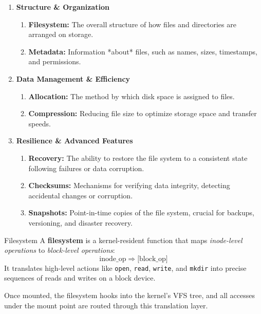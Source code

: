 \documentclass[openany, 12pt]{book}
\begin{document}
\begin{enumerate}
	\item \textbf{Structure \& Organization}
	      \begin{enumerate}
		      \item \textbf{Filesystem:} The overall structure of how files and
		            directories are arranged on storage.
		      \item \textbf{Metadata:} Information *about* files, such as names,
		            sizes, timestamps, and permissions.
	      \end{enumerate}
	\item \textbf{Data Management \& Efficiency}
	      \begin{enumerate}
		      \item \textbf{Allocation:} The method by which disk space is
		            assigned to files.
		      \item \textbf{Compression:} Reducing file size to optimize storage
		            space and transfer speeds.
	      \end{enumerate}
	\item \textbf{Resilience \& Advanced Features}
	      \begin{enumerate}
		      \item \textbf{Recovery:} The ability to restore the file system to
		            a consistent state following failures or data corruption.
		      \item \textbf{Checksums:} Mechanisms for verifying data integrity,
		            detecting accidental changes or corruption.
		      \item \textbf{Snapshots:} Point-in-time copies of the file system,
		            crucial for backups, versioning, and disaster recovery.
	      \end{enumerate}
\end{enumerate}

\begin{definition}{Filesystem}{}
	A \textbf{filesystem} is a kernel-resident function that maps
	\textit{inode-level operations} to \textit{block-level operations}: \[
		\text{inode\_op} \;\Rightarrow\; \text{[block\_op]} \] It translates
	high-level actions like \texttt{open}, \texttt{read}, \texttt{write}, and
	\texttt{mkdir} into precise sequences of reads and writes on a block device.

	Once mounted, the filesystem hooks into the kernel's VFS tree, and all
	accesses under the mount point are routed through this translation layer.
\end{definition}
\end{document}
